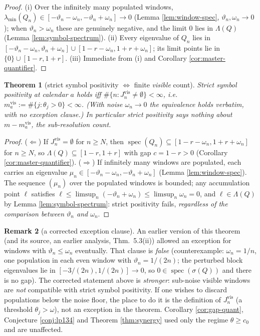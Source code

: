 \documentclass[11pt,reqno]{amsart}
\newtheorem{theorem}{Theorem}[section]
\theoremstyle{definition}
\newtheorem{remark}[theorem]{Remark}
\newcommand{\spec}{\operatorname{spec}}
\begin{document}
\begin{proof}
(i) Over the infinitely many populated windows,
\(\lambda_{\min}(Q_n)\in[-\vartheta_n-\omega_n,-\vartheta_n+\omega_n]\to0\)
(Lemma \ref{lem:window-spec}, \(\vartheta_n,\omega_n\to0\)); when
\(\vartheta_n>\omega_n\) these are genuinely negative, and the limit \(0\) lies
in \(\Lambda(Q)\) (Lemma \ref{lem:symbol-spectrum}). (ii) Every eigenvalue of
\(Q_n\) lies in
\([-\vartheta_n-\omega_n,\vartheta_n+\omega_n]\cup[1-r-\omega_n,1+r+\omega_n]\);
its limit points lie in \(\{0\}\cup[1-r,1+r]\). (iii) Immediate from (i) and
Corollary \ref{cor:master-quantifier}.
\end{proof}

\begin{theorem}[strict symbol positivity \(\iff\) finite \emph{visible} count]
\label{thm:strict}
Strict symbol positivity at calendar \(a\)
holds iff \(\#\{n:J_n^{\mathrm{vis}}\neq\emptyset\}<\infty\), i.e.\
\(m_a^{\mathrm{vis}}:=\#\{j:\theta_j>0\}<\infty\). \textup{(}With noise
\(\omega_n\to0\) the equivalence holds \emph{verbatim}, with no exception
clause.\textup{)} In particular strict positivity says \emph{nothing} about
\(m-m_a^{\mathrm{vis}}\), the sub-resolution count.
\end{theorem}

\begin{proof}
(\(\Leftarrow\)) If \(J_n^{\mathrm{vis}}=\emptyset\) for \(n\geq N\),
then \(\spec(Q_n)\subseteq[1-r-\omega_n,1+r+\omega_n]\) for \(n\geq N\), so
\(\Lambda(Q)\subseteq[1-r,1+r]\) with gap \(c=1-r>0\) (Corollary
\ref{cor:master-quantifier}). (\(\Rightarrow\)) If infinitely many windows are
populated, each carries an eigenvalue
\(\mu_n\in[-\vartheta_n-\omega_n,-\vartheta_n+\omega_n]\) (Lemma
\ref{lem:window-spec}). The sequence \((\mu_n)\) over the populated windows is
bounded; any accumulation point \(\ell\) satisfies
\(\ell\leq\limsup_n(-\vartheta_n+\omega_n)\leq\limsup_n\omega_n=0\), and
\(\ell\in\Lambda(Q)\) by Lemma \ref{lem:symbol-spectrum}: strict positivity
fails, \emph{regardless of the comparison between \(\vartheta_n\) and
\(\omega_n\)}.
\end{proof}

\begin{remark}[a corrected exception clause]\label{rem:strict-corrected}
An earlier version of this theorem (and its source, an earlier analysis,
Thm.~5.3(ii)) allowed an exception for windows with
\(\vartheta_n\leq\omega_n\) eventually. That clause is \emph{false}
(counterexample: \(\omega_n=1/n\), one population in each even window with
\(\vartheta_n=1/(2n)\); the perturbed block eigenvalues lie in
\([-3/(2n),1/(2n)]\to0\), so \(0\in\spec(\sigma(Q))\) and there is no gap). The
corrected statement above is \emph{stronger}: sub-noise visible windows are
\emph{not} compatible with strict symbol positivity. If one wishes to discard
populations below the noise floor, the place to do it is the definition of
\(J_n^{\mathrm{vis}}\) (a threshold \(\theta_j>\omega\)), not an exception in
the theorem. Corollary \ref{cor:gap-quant}, Conjecture \ref{conj:lp134} and
Theorem \ref{thm:synergy} used only the regime \(\theta\geq c_0\) and are
unaffected.
\end{remark}
\end{document}
